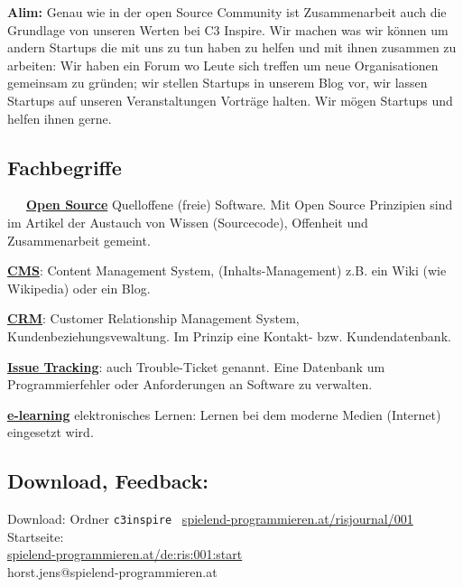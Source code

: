\textbf{Alim:} Genau wie in der open Source Community ist Zusammenarbeit auch 
die Grundlage von unseren Werten bei C3 Inspire. Wir machen was wir 
können um andern Startups die mit uns zu tun haben zu helfen und mit 
ihnen zusammen zu arbeiten: Wir haben ein Forum wo Leute sich treffen 
um neue Organisationen gemeinsam zu gründen; wir stellen Startups in 
unserem Blog vor,  wir lassen Startups auf unseren Veranstaltungen 
Vorträge halten. Wir mögen Startups und helfen ihnen gerne.


\subsection*{Fachbegriffe}
~~~\href{https://de.wikipedia.org/wiki/Portal:Freie_Software}{\textbf{Open Source}} Quelloffene (freie) Software. Mit Open Source Prinzipien sind im Artikel der Austauch von Wissen (Sourcecode), Offenheit und Zusammenarbeit gemeint. 

\href{https://de.wikipedia.org/wiki/Content-Management-System}{\textbf{CMS}}: Content Management System, (Inhalts-Management) z.B. ein Wiki (wie Wikipedia) oder ein Blog. 

\href{https://de.wikipedia.org/wiki/Customer-Relationship-Management}{\textbf{CRM}}: Customer Relationship Management System, Kundenbeziehungsvewaltung. Im Prinzip eine Kontakt- bzw. Kundendatenbank.

\href{https://de.wikipedia.org/wiki/Issue-Tracking-System}{\textbf{Issue Tracking}}: auch Trouble-Ticket genannt. Eine Datenbank um Programmierfehler oder Anforderungen an Software zu verwalten. 

\href{https://de.wikipedia.org/wiki/ELearning}{\textbf{e-learning}} elektronisches Lernen: Lernen bei dem moderne Medien (Internet) eingesetzt wird.

\subsection*{Download, Feedback:}
\footnotesize{
Download: Ordner \texttt{c3inspire} \Mundus\ \href{http://spielend-programmieren.at/risjournal/001}{spielend-programmieren.at/risjournal/001}\\
Startseite:\\
\href{http://spielend-programmieren.at/de:ris:001:start}{spielend-programmieren.at/de:ris:001:start}\\ 
\Letter\: horst.jens@spielend-programmieren.at}
\normalsize

